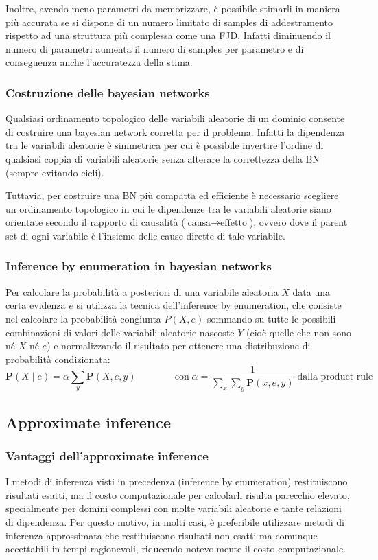 Inoltre, avendo meno parametri da memorizzare, è possibile stimarli in maniera più accurata se si dispone di un numero limitato
di samples di addestramento rispetto ad una struttura più complessa come una FJD. Infatti diminuendo il numero di parametri
aumenta il numero di samples per parametro e di conseguenza anche l'accuratezza della stima.

\subsubsection*{Costruzione delle bayesian networks}
Qualsiasi ordinamento topologico delle variabili aleatorie di un dominio consente di costruire una bayesian network
corretta per il problema. Infatti la dipendenza tra le variabili aleatorie è simmetrica per cui è possibile invertire
l'ordine di qualsiasi coppia di variabili aleatorie senza alterare la correttezza della BN (sempre evitando cicli).

Tuttavia, per costruire una BN più compatta ed efficiente è necessario scegliere un ordinamento topologico in cui le
dipendenze tra le variabili aleatorie siano orientate secondo il rapporto di causalità (\(\text{causa} \to \text{effetto}\)),
ovvero dove il parent set di ogni variabile è l'insieme delle cause dirette di tale variabile.

\subsubsection*{Inference by enumeration in bayesian networks}
Per calcolare la probabilità a posteriori di una variabile aleatoria \(X\) data una certa evidenza \(e\) si utilizza la
tecnica dell'inference by enumeration, che consiste nel calcolare la probabilità congiunta \(P(X, e)\) sommando su tutte
le possibili combinazioni di valori delle variabili aleatorie nascoste \(Y\) (cioè quelle che non sono né \(X\) né \(e\))
e normalizzando il risultato per ottenere una distribuzione di probabilità condizionata:
\[\textbf{P}(X \mid e) = \alpha \sum_{y} \textbf{P}(X, e, y) \qquad\qquad \text{con} \; \alpha = \frac{1}{\sum_{x} \sum_{y} \textbf{P}(x, e, y)} \; \text{dalla product rule}\]

\newpage

\subsection{Approximate inference}
\subsubsection*{Vantaggi dell'approximate inference}
I metodi di inferenza visti in precedenza (inference by enumeration) restituiscono risultati esatti, ma il costo computazionale
per calcolarli risulta parecchio elevato, specialmente per domini complessi con molte variabili aleatorie e tante relazioni
di dipendenza. Per questo motivo, in molti casi, è preferibile utilizzare metodi di inferenza approssimata che restituiscono
risultati non esatti ma comunque accettabili in tempi ragionevoli, riducendo notevolmente il costo computazionale.

